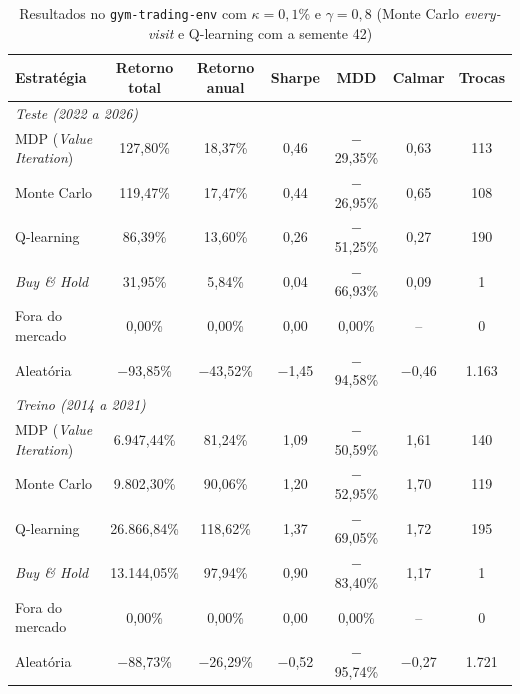 \documentclass[conference]{IEEEtran}
\begin{document}
\begin{table}[!t]
  \centering
  \caption{Resultados no \texttt{gym-trading-env} com $\kappa = 0{,}1\%$ e $\gamma = 0{,}8$ (Monte Carlo \textit{every-visit} e Q-learning com a semente 42)}
  \label{tab:resultados}
  \footnotesize
  \setlength{\tabcolsep}{8pt}
  \renewcommand{\arraystretch}{1.1}
  \begin{tabular}{l cccccc}
    \toprule
    \textbf{Estratégia} & \textbf{Retorno total} & \textbf{Retorno anual} & \textbf{Sharpe} & \textbf{MDD} & \textbf{Calmar} & \textbf{Trocas} \\
    \midrule
    \multicolumn{7}{l}{\textit{Teste (2022 a 2026)}} \\
    MDP (\textit{Value Iteration}) & 127,80\%     & 18,37\%      & 0,46      & $-$29,35\% & 0,63      & 113 \\
    Monte Carlo                    & 119,47\%     & 17,47\%      & 0,44      & $-$26,95\% & 0,65      & 108 \\
    Q-learning                     & 86,39\%      & 13,60\%      & 0,26      & $-$51,25\% & 0,27      & 190 \\
    \textit{Buy \& Hold}           & 31,95\%      & 5,84\%       & 0,04      & $-$66,93\% & 0,09      & 1 \\
    Fora do mercado                & 0,00\%       & 0,00\%       & 0,00      & 0,00\%     & --        & 0 \\
    Aleatória                      & $-$93,85\%   & $-$43,52\%   & $-$1,45   & $-$94,58\% & $-$0,46   & 1.163 \\
    \midrule
    \multicolumn{7}{l}{\textit{Treino (2014 a 2021)}} \\
    MDP (\textit{Value Iteration}) & 6.947,44\%   & 81,24\%      & 1,09      & $-$50,59\% & 1,61      & 140 \\
    Monte Carlo                    & 9.802,30\%   & 90,06\%      & 1,20      & $-$52,95\% & 1,70      & 119 \\
    Q-learning                     & 26.866,84\%  & 118,62\%     & 1,37      & $-$69,05\% & 1,72      & 195 \\
    \textit{Buy \& Hold}           & 13.144,05\%  & 97,94\%      & 0,90      & $-$83,40\% & 1,17      & 1 \\
    Fora do mercado                & 0,00\%       & 0,00\%       & 0,00      & 0,00\%     & --        & 0 \\
    Aleatória                      & $-$88,73\%   & $-$26,29\%   & $-$0,52   & $-$95,74\% & $-$0,27   & 1.721 \\
    \bottomrule
  \end{tabular}
\end{table}
\end{document}
